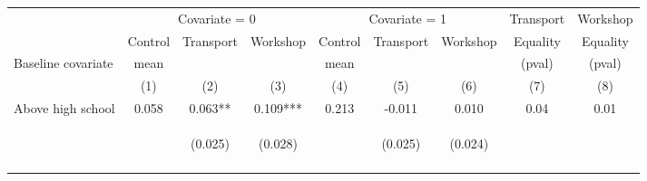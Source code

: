 \begin{tabular}{lcccccccc}
\hline \noalign{\smallskip} & \multicolumn{3}{c}{Covariate = 0} & \multicolumn{3}{c}{Covariate = 1} & Transport & Workshop\\
\cmidrule(lr){2-4}\cmidrule(lr){5-7}\cmidrule(lr){8-9} & Control & {Transport} & {Workshop} & Control & {Transport} & {Workshop} & {Equality} & {Equality}\\
Baseline covariate & mean &  &  & mean &  &  & (pval) & (pval)\\
 & (1) & (2) & (3) & (4) & (5) & (6) & (7) & (8)\\
\noalign{\smallskip}\hline \noalign{\smallskip}Above high school & 0.058 & 0.063** & 0.109*** & 0.213 & -0.011 & 0.010 & 0.04 & 0.01\\
 & \begin{footnotesize}\end{footnotesize} & \begin{footnotesize}(0.025)\end{footnotesize} & \begin{footnotesize}(0.028)\end{footnotesize} & \begin{footnotesize}\end{footnotesize} & \begin{footnotesize}(0.025)\end{footnotesize} & \begin{footnotesize}(0.024)\end{footnotesize} & \begin{footnotesize}\end{footnotesize} & \begin{footnotesize}\end{footnotesize}\\
 & \begin{footnotesize}\end{footnotesize} & \begin{footnotesize}[0.027]\end{footnotesize} & \begin{footnotesize}[0.001]\end{footnotesize} & \begin{footnotesize}\end{footnotesize} & \begin{footnotesize}[1.000]\end{footnotesize} & \begin{footnotesize}[0.371]\end{footnotesize} & \begin{footnotesize}\end{footnotesize} & \begin{footnotesize}\end{footnotesize}\\

\end{tabular}

